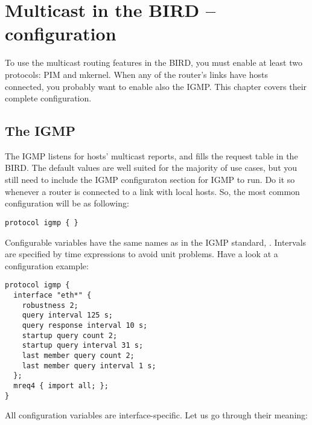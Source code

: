 \chapter{Multicast in the BIRD -- configuration}

To use the multicast routing features in the BIRD, you must enable at least two
protocols: PIM and mkernel. When any of the router's links have hosts
connected, you probably want to enable also the IGMP. This chapter covers their
complete configuration.

\section{The IGMP}

The IGMP listens for hosts' multicast reports, and fills the request table in
the BIRD. The default values are well suited for the majority of use cases, but
you still need to include the IGMP configuraton section for IGMP to run. Do it
so whenever a router is connected to a link with local hosts. So, the most
common configuration will be as following:

\begin{lstlisting}
protocol igmp { }
\end{lstlisting}

Configurable variables have the same names as in the IGMP standard, .
Intervals are specified by time expressions to avoid unit problems. Have a look
at a configuration example:

\begin{lstlisting}
protocol igmp {
  interface "eth*" {
    robustness 2;
    query interval 125 s;
    query response interval 10 s;
    startup query count 2;
    startup query interval 31 s;
    last member query count 2;
    last member query interval 1 s;
  };
  mreq4 { import all; };
}
\end{lstlisting}

All configuration variables are interface-specific. Let us go through their meaning:

